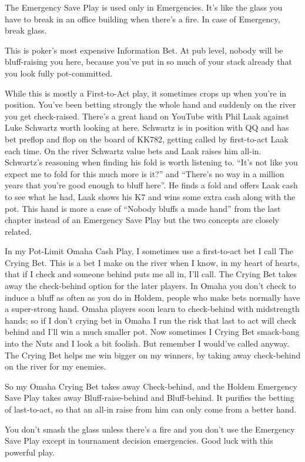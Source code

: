 The Emergency Save Play is used only in Emergencies. It's like the
glass you have to break in an office building when there's a fire. In
case of Emergency, break glass.

This is poker's most expensive Information Bet. At pub level, nobody
will be bluff-raising you here, because you've put in so much of your
stack already that you look fully pot-committed.

While this is mostly a First-to-Act play, it sometimes crops up when
you're in position. You've been betting strongly the whole hand and
suddenly on the river you get check-raised. There's a great hand on
YouTube with Phil Laak against Luke Schwartz worth looking at here.
Schwartz is in position with QQ and has bet preflop and flop on the
board of KK782, getting called by first-to-act Laak each time.
On the river Schwartz value bets and Laak raises him all-in. Schwartz's
reasoning when finding his fold is worth listening to. ``It's not like
you expect me to fold for this much more is it?'' and ``There's no way
in a million years that you're good enough to bluff here''. He finds a
fold and offers Laak cash to see what he had, Laak shows his K7 and
wins some extra cash along with the pot. This hand is more a case of
``Nobody bluffs a made hand'' from the last chapter instead of
an Emergency Save Play but the two concepts are closely related.

In my Pot-Limit Omaha Cash Play, I sometimes use a first-to-act bet
I call The Crying Bet. This is a bet I make on the river when I
know, in my heart of hearts, that if I check and someone behind puts me
all in, I'll call. The Crying Bet takes away the check-behind option
for the later players. In Omaha you don't check to induce a bluff as
often as you do in Holdem, people who make bets normally have a
super-strong hand. Omaha players soon learn to check-behind with
midstrength hands; so if I don't crying bet in Omaha I run the
risk that last to act will check behind and I'll win a much smaller
pot. Now sometimes I Crying Bet smack-bang into the
Nuts and I look a bit foolish. But remember I would've called
anyway. The Crying Bet helps me win bigger on my winners, by
taking away check-behind on the river for my enemies.

So my Omaha Crying Bet takes away Check-behind, and the Holdem
Emergency Save Play takes away Bluff-raise-behind and Bluff-behind. It
purifies the betting of last-to-act, so that an all-in raise from him
can only come from a better hand.

You don't smash the glass unless there's a fire and you don't use the
Emergency Save Play except in tournament decision emergencies. Good
luck with this powerful play.
